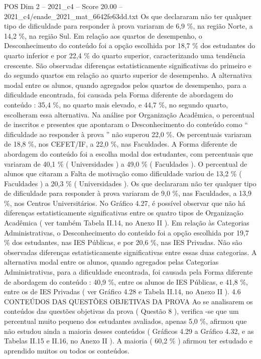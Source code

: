 \begin{textsample}{POS Dim 2 – 2021\_c4 – Score 20.00 – 2021\_c4/enade\_2021\_mat\_6642fe63dd.txt}
Os que declararam não ter qualquer tipo de dificuldade para responder à prova variaram de 6,9 \%, na região Norte, a 14,2 \%, na região Sul.
Em relação aos quartos de desempenho, o Desconhecimento do conteúdo foi a opção escolhida por 18,7 \% dos estudantes do quarto inferior e por 22,4 \% do quarto superior, caracterizando uma tendência crescente.
São observadas diferenças estatisticamente significativas do primeiro e do segundo quartos em relação ao quarto superior de desempenho.
A alternativa modal entre os alunos, quando agregados pelos quartos de desempenho, para a dificuldade encontrada, foi causada pela Forma diferente de abordagem do conteúdo : 35,4 \%, no quarto mais elevado, e 44,7 \%, no segundo quarto, escolheram essa alternativa.
Na análise por Organização Acadêmica, o percentual de inscritos e presentes que apontaram o Desconhecimento do conteúdo como “ dificuldade ao responder à prova ” não superou 22,0 \%.
Os percentuais variaram de 18,8 \%, nos CEFET/IF, a 22,0 \%, nas Faculdades.
A Forma diferente de abordagem do conteúdo foi a escolha modal dos estudantes, com percentuais que variaram de 40,1 \% ( Universidades ) a 49,0 \% ( Faculdades ).
O percentual de alunos que citaram a Falta de motivação como dificuldade variou de 13,2 \% ( Faculdades ) a 20,3 \% ( Universidades ).
Os que declararam não ter qualquer tipo de dificuldade para responder à prova variaram de 9,0 \%, nas Faculdades, a 13,9 \%, nos Centros Universitários.
No Gráfico 4.27, é possível observar que não há diferenças estatisticamente significativas entre os quatro tipos de Organização Acadêmica ( ver também Tabela II.14, no Anexo II ).
Em relação às Categorias Administrativas, o Desconhecimento do conteúdo foi a opção escolhida por 19,7 \% dos estudantes, nas IES Públicas, e por 20,6 \%, nas IES Privadas.
Não são observadas diferenças estatisticamente significativas entre essas duas categorias.
A alternativa modal entre os alunos, quando agregados pelas Categorias Administrativas, para a dificuldade encontrada, foi causada pela Forma diferente de abordagem do conteúdo : 40,9 \%, entre os alunos de IES Públicas, e 41,8 \%, entre os de IES Privadas ( ver Gráfico 4.28 e Tabela II.14, no Anexo II ). 4.6 CONTEÚDOS DAS QUESTÕES OBJETIVAS DA PROVA Ao se analisarem os conteúdos das questões objetivas da prova ( Questão 8 ), verifica -se que um percentual muito pequeno dos estudantes avaliados, apenas 5,0 \%, afirmou que não estudou ainda a maioria desses conteúdos ( Gráficos 4.29 a Gráfico 4.32, e as Tabelas II.15 e II.16, no Anexo II ).
A maioria ( 60,2 \% ) afirmou ter estudado e aprendido muitos ou todos os conteúdos.

\end{textsample}

